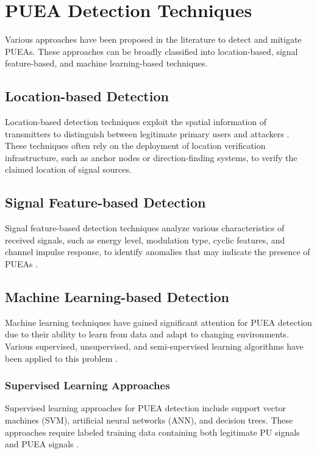 \section{PUEA Detection Techniques}
Various approaches have been proposed in the literature to detect and mitigate PUEAs. These approaches can be broadly classified into location-based, signal feature-based, and machine learning-based techniques.

\subsection{Location-based Detection}
Location-based detection techniques exploit the spatial information of transmitters to distinguish between legitimate primary users and attackers \cite{chen2008defense}. These techniques often rely on the deployment of location verification infrastructure, such as anchor nodes or direction-finding systems, to verify the claimed location of signal sources.

\subsection{Signal Feature-based Detection}
Signal feature-based detection techniques analyze various characteristics of received signals, such as energy level, modulation type, cyclic features, and channel impulse response, to identify anomalies that may indicate the presence of PUEAs \cite{yu2011optimal}.

\subsection{Machine Learning-based Detection}
Machine learning techniques have gained significant attention for PUEA detection due to their ability to learn from data and adapt to changing environments. Various supervised, unsupervised, and semi-supervised learning algorithms have been applied to this problem \cite{kawalec2019application}.

\subsubsection{Supervised Learning Approaches}
Supervised learning approaches for PUEA detection include support vector machines (SVM), artificial neural networks (ANN), and decision trees. These approaches require labeled training data containing both legitimate PU signals and PUEA signals \cite{tang2015spectrumwatch}.

